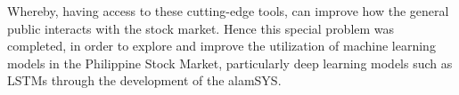 Whereby, having access to these cutting-edge tools, can improve how the general public interacts
with the stock market. Hence this special problem was completed, in order to 
explore and improve the utilization of machine learning models in the 
Philippine Stock Market, particularly deep learning models such as LSTMs through
the development of the alamSYS.